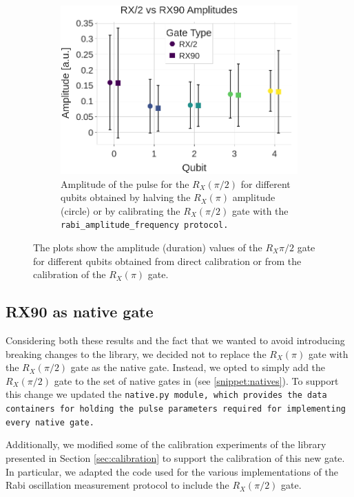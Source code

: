 \begin{figure}[h!]
\begin{subfigure}[t]{0.32\textwidth}
        \label{fig:RX90_duration}
    \end{subfigure}
    \hfill
    \begin{subfigure}[t]{0.32\textwidth}
        \includegraphics[width=\textwidth]{figures/png/RX90/rabi_af.png}
        \caption{Amplitude of the pulse for the $R_X(\pi/2)$ for different qubits obtained by halving the $R_X(\pi)$ amplitude (circle) or by calibrating the $R_X(\pi/2)$ gate with the \tt{rabi\_amplitude\_frequency} protocol.}
        \label{fig:RX90_af}
    \end{subfigure}
    \caption{The plots show the amplitude (duration) values of the $R_X{\pi/2}$ gate for different qubits obtained from direct calibration or from the calibration of the $R_X(\pi)$ gate.} 
    \label{fig:RXvsRX90}
\end{figure}

\subsection{RX90 as native gate}
Considering both these results and the fact that we wanted to avoid introducing breaking changes to the library, we decided not to replace the $R_X(\pi)$ gate with the $R_X(\pi/2)$ gate as the native gate. 
Instead, we opted to simply add the $R_X(\pi/2)$ gate to the set of native gates in \Qibolab (see \ref{snippet:natives}).
To support this change we updated the \tt{native.py} module, which provides the data containers for holding the pulse parameters required for implementing every native gate.

Additionally, we modified some of the calibration experiments of the \Qibocal library presented in Section \ref{sec:calibration} to support the calibration of this new gate.
In particular, we adapted the code used for the various implementations of the Rabi oscillation measurement protocol to include the $R_X(\pi/2)$ gate.

